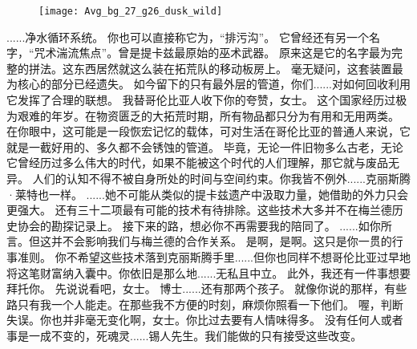 \documentclass[openany]{book}
\begin{document}
\begin{figure}[h]
    \centering
    \texttt{[image: Avg\_bg\_27\_g26\_dusk\_wild]}
\end{figure}
\begin{dialogue}
     ......净水循环系统。
     你也可以直接称它为，“排污沟”。
     它曾经还有另一个名字，“咒术湍流焦点”。曾是提卡兹最原始的巫术武器。
     原来这是它的名字最为完整的拼法。这东西居然就这么装在拓荒队的移动板房上。
     毫无疑问，这套装置最为核心的部分已经遗失。
     如今留下的只有最外层的管道，你们......对如何回收利用它发挥了合理的联想。
     我替哥伦比亚人收下你的夸赞，女士。
     这个国家经历过极为艰难的年岁。在物资匮乏的大拓荒时期，所有物品都只分为有用和无用两类。
     在你眼中，这可能是一段恢宏记忆的载体，可对生活在哥伦比亚的普通人来说，它就是一截好用的、多久都不会锈蚀的管道。
     毕竟，无论一件旧物多么古老，无论它曾经历过多么伟大的时代，如果不能被这个时代的人们理解，那它就与废品无异。
     人们的认知不得不被自身所处的时间与空间约束。你我皆不例外......克丽斯腾·莱特也一样。
     ......她不可能从类似的提卡兹遗产中汲取力量，她借助的外力只会更强大。
     还有三十二项最有可能的技术有待排除。这些技术大多并不在梅兰德历史协会的勘探记录上。
     接下来的路，想必你不再需要我的陪同了。
     ......如你所言。但这并不会影响我们与梅兰德的合作关系。
     是啊，是啊。这只是你一贯的行事准则。
     你不希望这些技术落到克丽斯腾手里......但你也同样不想哥伦比亚过早地将这笔财富纳入囊中。你依旧是那么地......无私且中立。
     此外，我还有一件事想要拜托你。
     先说说看吧，女士。
     博士......还有那两个孩子。
     就像你说的那样，有些路只有我一个人能走。在那些我不方便的时刻，麻烦你照看一下他们。
     喔，判断失误。你也并非毫无变化啊，女士。你比过去要有人情味得多。
     没有任何人或者事是一成不变的，死魂灵......锡人先生。我们能做的只有接受这些改变。
\end{dialogue}
\end{document}
